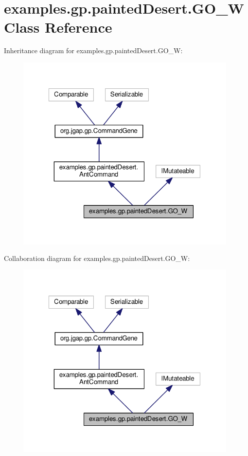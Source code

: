 \hypertarget{classexamples_1_1gp_1_1painted_desert_1_1_g_o___w}{\section{examples.\-gp.\-painted\-Desert.\-G\-O\-\_\-\-W Class Reference}
\label{classexamples_1_1gp_1_1painted_desert_1_1_g_o___w}
}


Inheritance diagram for examples.\-gp.\-painted\-Desert.\-G\-O\-\_\-\-W\-:
\nopagebreak
\begin{figure}[H]
\begin{center}
\leavevmode
\includegraphics[width=313pt]{classexamples_1_1gp_1_1painted_desert_1_1_g_o___w__inherit__graph}
\end{center}
\end{figure}


Collaboration diagram for examples.\-gp.\-painted\-Desert.\-G\-O\-\_\-\-W\-:
\nopagebreak
\begin{figure}[H]
\begin{center}
\leavevmode
\includegraphics[width=313pt]{classexamples_1_1gp_1_1painted_desert_1_1_g_o___w__coll__graph}
\end{center}
\end{figure}
